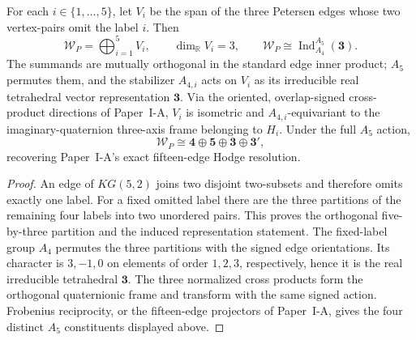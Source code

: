 \documentclass[12pt,a4paper]{article}
\begin{document}
\begin{theorem}
\label{p5:thm:v321-induced-local-edge-module}
For each $i\in\{1,\ldots,5\}$, let $V_i$ be the span of the three
Petersen edges whose two vertex-pairs omit the label $i$. Then
\[
 \boxed{\mathscr W_P=\bigoplus_{i=1}^5V_i,\qquad
 \dim_{\mathbb R}V_i=3,\qquad
 \mathscr W_P\cong\operatorname{Ind}_{A_4}^{A_5}(\mathbf3).}
\]
The summands are mutually orthogonal in the standard edge inner product;
$A_5$ permutes them, and the stabilizer $A_{4,i}$ acts on $V_i$ as its
irreducible real tetrahedral vector representation $\mathbf3$. Via the
oriented, overlap-signed cross-product directions of Paper~I-A, $V_i$ is
isometric and $A_{4,i}$-equivariant to the imaginary-quaternion three-axis
frame belonging to $H_i$. Under the full $A_5$ action,
\[
 \mathscr W_P\cong\mathbf4\oplus\mathbf5\oplus\mathbf3\oplus\mathbf3',
\]
recovering Paper~I-A's exact fifteen-edge Hodge resolution.
\end{theorem}
\begin{proof}
An edge of $KG(5,2)$ joins two disjoint two-subsets and therefore omits
exactly one label. For a fixed omitted label there are the three partitions
of the remaining four labels into two unordered pairs. This proves the
orthogonal five-by-three partition and the induced representation statement.
The fixed-label group $A_4$ permutes the three partitions with the signed
edge orientations. Its character is $3,-1,0$ on elements of order $1,2,3$,
respectively, hence it is the real irreducible tetrahedral $\mathbf3$.
The three normalized cross products form the orthogonal quaternionic frame
and transform with the same signed action. Frobenius reciprocity, or the
fifteen-edge projectors of Paper~I-A, gives the four distinct $A_5$
constituents displayed above.
\end{proof}
\end{document}
